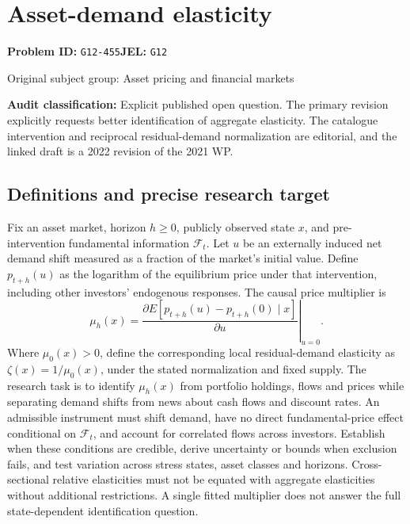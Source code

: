 \documentclass[11pt,a4paper]{article}
\begin{document}
\section*{Asset-demand elasticity}
\textbf{Problem ID:} \texttt{G12-455}\quad \textbf{JEL:} \texttt{G12}\par
\label{problem:OP-0312}
{\sffamily\small\color{muted}Original subject group: Asset pricing and financial markets\par}
\label{definitions:problem:30007594}
\textbf{Audit classification:} Explicit published open question. The primary revision explicitly requests better identification of aggregate elasticity. The catalogue intervention and reciprocal residual-demand normalization are editorial, and the linked draft is a 2022 revision of the 2021 WP.
\subsection*{Definitions and precise research target}
Fix an asset market, horizon \(h\geq0\), publicly observed state \(x\), and pre-intervention fundamental information \(\mathcal F_t\). Let \(u\) be an externally induced net demand shift measured as a fraction of the market's initial value. Define \(p_{t+h}(u)\) as the logarithm of the equilibrium price under that intervention, including other investors' endogenous responses. The causal price multiplier is
\[\mu_h(x)=\left.\frac{\partial E[p_{t+h}(u)-p_{t+h}(0)\mid x]}{\partial u}\right|_{u=0}.\]
Where \(\mu_0(x)>0\), define the corresponding local residual-demand elasticity as \(\zeta(x)=1/\mu_0(x)\), under the stated normalization and fixed supply. The research task is to identify \(\mu_h(x)\) from portfolio holdings, flows and prices while separating demand shifts from news about cash flows and discount rates. An admissible instrument must shift demand, have no direct fundamental-price effect conditional on \(\mathcal F_t\), and account for correlated flows across investors. Establish when these conditions are credible, derive uncertainty or bounds when exclusion fails, and test variation across stress states, asset classes and horizons. Cross-sectional relative elasticities must not be equated with aggregate elasticities without additional restrictions. A single fitted multiplier does not answer the full state-dependent identification question.
\end{document}
